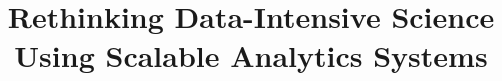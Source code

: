 \documentclass{acm_proc_article-sp}
\begin{document}
\title{Rethinking Data-Intensive Science Using \linebreak Scalable Analytics Systems}
%
%
%
%
%

%
\author{}
%
%


\maketitle
\end{document}
